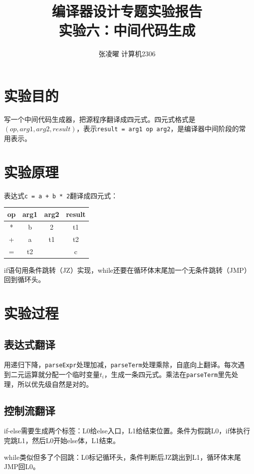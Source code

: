 \documentclass[12pt,a4paper]{ctexart}
\title{\textbf{编译器设计专题实验报告}\\[0.5em]\Large\color{themecolor}实验六：中间代码生成}
\author{张凌曜 \quad 2234214014 \quad 计算机2306}
\date{}
\begin{document}
\maketitle

\section{实验目的}
写一个中间代码生成器，把源程序翻译成四元式。四元式格式是$(op, arg1, arg2, result)$，表示\texttt{result = arg1 op arg2}，是编译器中间阶段的常用表示。

\section{实验原理}
表达式\texttt{c = a + b * 2}翻译成四元式：

\begin{center}
\begin{tabular}{cccc}
\toprule
op & arg1 & arg2 & result \\
\midrule
* & b & 2 & t1 \\
+ & a & t1 & t2 \\
= & t2 & & c \\
\bottomrule
\end{tabular}
\end{center}

if语句用条件跳转（JZ）实现，while还要在循环体末尾加一个无条件跳转（JMP）回到循环头。

\section{实验过程}

\subsection{表达式翻译}
用递归下降，\texttt{parseExpr}处理加减，\texttt{parseTerm}处理乘除，自底向上翻译。每次遇到二元运算就分配一个临时变量$t_i$，生成一条四元式。乘法在\texttt{parseTerm}里先处理，所以优先级自然是对的。

\subsection{控制流翻译}
if-else需要生成两个标签：L0给else入口，L1给结束位置。条件为假跳L0，if体执行完跳L1，然后L0开始else体，L1结束。

while类似但多了个回跳：L0标记循环头，条件判断后JZ跳出到L1，循环体末尾JMP回L0。
\end{document}
